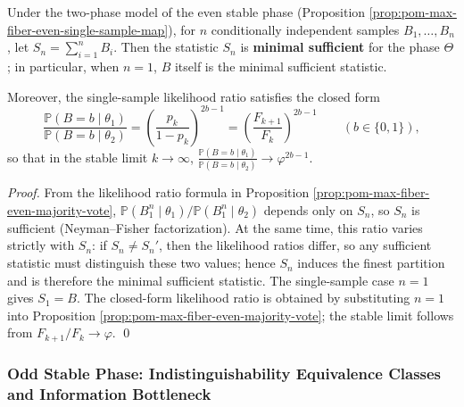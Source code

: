 \begin{proposition}\label{prop:pom-max-fiber-hidden-bit-minimal-sufficient}
Under the two-phase model of the even stable phase (Proposition \ref{prop:pom-max-fiber-even-single-sample-map}),
for \(n\) conditionally independent samples \(B_1,\dots,B_n\), let \(S_n=\sum_{i=1}^n B_i\).
Then the statistic \(S_n\) is \textbf{minimal sufficient} for the phase \(\Theta\); in particular, when \(n=1\), \(B\) itself is the minimal sufficient statistic.
\par
Moreover, the single-sample likelihood ratio satisfies the closed form
\[
\boxed{\;
\frac{\mathbb{P}(B=b\mid\theta_1)}{\mathbb{P}(B=b\mid\theta_2)}
=\left(\frac{p_k}{1-p_k}\right)^{2b-1}
=\left(\frac{F_{k+1}}{F_k}\right)^{2b-1}\qquad(b\in\{0,1\}),\;}
\]
so that in the stable limit \(k\to\infty\),
\(
\frac{\mathbb{P}(B=b\mid\theta_1)}{\mathbb{P}(B=b\mid\theta_2)}\to \varphi^{2b-1}
\).
\end{proposition}

\begin{proof}
From the likelihood ratio formula in Proposition \ref{prop:pom-max-fiber-even-majority-vote},
\(
\mathbb{P}(B_1^n\mid\theta_1)/\mathbb{P}(B_1^n\mid\theta_2)
\)
depends only on \(S_n\), so \(S_n\) is sufficient (Neyman--Fisher factorization).
At the same time, this ratio varies strictly with \(S_n\): if \(S_n\neq S_n'\), then the likelihood ratios differ, so any sufficient statistic must distinguish these two values; hence \(S_n\) induces the finest partition and is therefore the minimal sufficient statistic.
The single-sample case \(n=1\) gives \(S_1=B\).
The closed-form likelihood ratio is obtained by substituting \(n=1\) into Proposition \ref{prop:pom-max-fiber-even-majority-vote}; the stable limit follows from \(F_{k+1}/F_k\to\varphi\). \qed
\end{proof}

\subsubsection{Odd Stable Phase: Indistinguishability Equivalence Classes and Information Bottleneck}

